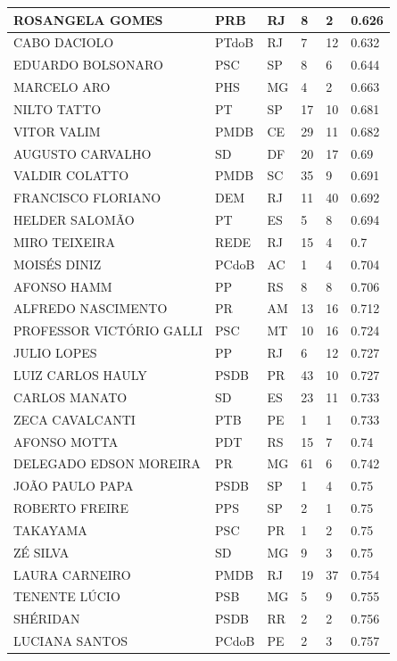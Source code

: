 \begin{apendicesenv}
\begin{longtable}{|L{4cm}|C{2cm}|C{1cm}|C{2cm}|C{1cm}|C{2cm}|}
ROSANGELA GOMES & PRB & RJ & 8 & 2 & 0.626 \\ \hline
CABO DACIOLO & PTdoB & RJ & 7 & 12 & 0.632 \\ \hline
EDUARDO BOLSONARO & PSC & SP & 8 & 6 & 0.644 \\ \hline
MARCELO ARO & PHS & MG & 4 & 2 & 0.663 \\ \hline
NILTO TATTO & PT & SP & 17 & 10 & 0.681 \\ \hline
VITOR VALIM & PMDB & CE & 29 & 11 & 0.682 \\ \hline
AUGUSTO CARVALHO & SD & DF & 20 & 17 & 0.69 \\ \hline
VALDIR COLATTO & PMDB & SC & 35 & 9 & 0.691 \\ \hline
FRANCISCO FLORIANO & DEM & RJ & 11 & 40 & 0.692 \\ \hline
HELDER SALOMÃO & PT & ES & 5 & 8 & 0.694 \\ \hline
MIRO TEIXEIRA & REDE & RJ & 15 & 4 & 0.7 \\ \hline
MOISÉS DINIZ & PCdoB & AC & 1 & 4 & 0.704 \\ \hline
AFONSO HAMM & PP & RS & 8 & 8 & 0.706 \\ \hline
ALFREDO NASCIMENTO & PR & AM & 13 & 16 & 0.712 \\ \hline
PROFESSOR VICTÓRIO GALLI & PSC & MT & 10 & 16 & 0.724 \\ \hline
JULIO LOPES & PP & RJ & 6 & 12 & 0.727 \\ \hline
LUIZ CARLOS HAULY & PSDB & PR & 43 & 10 & 0.727 \\ \hline
CARLOS MANATO & SD & ES & 23 & 11 & 0.733 \\ \hline
ZECA CAVALCANTI & PTB & PE & 1 & 1 & 0.733 \\ \hline
AFONSO MOTTA & PDT & RS & 15 & 7 & 0.74 \\ \hline
DELEGADO EDSON MOREIRA & PR & MG & 61 & 6 & 0.742 \\ \hline
JOÃO PAULO PAPA & PSDB & SP & 1 & 4 & 0.75 \\ \hline
ROBERTO FREIRE & PPS & SP & 2 & 1 & 0.75 \\ \hline
TAKAYAMA & PSC & PR & 1 & 2 & 0.75 \\ \hline
ZÉ SILVA & SD & MG & 9 & 3 & 0.75 \\ \hline
LAURA CARNEIRO & PMDB & RJ & 19 & 37 & 0.754 \\ \hline
TENENTE LÚCIO & PSB & MG & 5 & 9 & 0.755 \\ \hline
SHÉRIDAN & PSDB & RR & 2 & 2 & 0.756 \\ \hline
LUCIANA SANTOS & PCdoB & PE & 2 & 3 & 0.757 \\ \hline

\end{longtable}
\end{apendicesenv}
